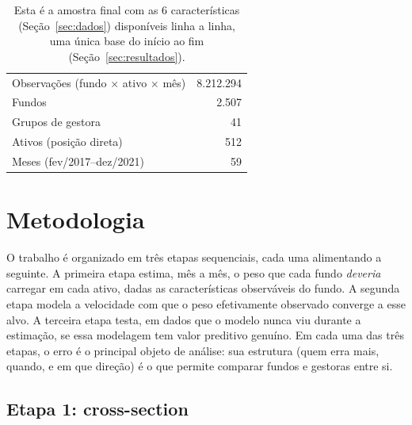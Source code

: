 \documentclass[11pt,a4paper]{article}
\begin{document}
\begin{table}[h]\centering
\caption{Dimensões da amostra final. Fonte: \texttt{painel\_multiativo\_final.csv}.}
\label{tab:amostra}
\begin{tabular}{@{}lr@{}}
\toprule
Observações (fundo $\times$ ativo $\times$ mês) & 8.212.294 \\
Fundos & 2.507 \\
Grupos de gestora & 41 \\
Ativos (posição direta) & 512 \\
Meses (fev/2017--dez/2021) & 59 \\
\bottomrule
\end{tabular}
\caption*{\footnotesize Esta é a amostra final com as 6 características (Seção~\ref{sec:dados})
disponíveis linha a linha, uma única base do início ao fim (Seção~\ref{sec:resultados}).}
\end{table}

\section{Metodologia}
\label{sec:metodologia}

O trabalho é organizado em três etapas sequenciais, cada uma alimentando a seguinte. A primeira
etapa estima, mês a mês, o peso que cada fundo \emph{deveria} carregar em cada ativo, dadas as
características observáveis do fundo. A segunda etapa modela a velocidade com que o peso
efetivamente observado converge a esse alvo. A terceira etapa testa, em dados que o modelo nunca
viu durante a estimação, se essa modelagem tem valor preditivo genuíno. Em cada uma das três
etapas, o erro é o principal objeto de análise: sua estrutura (quem erra mais, quando, e em que
direção) é o que permite comparar fundos e gestoras entre si.

\FloatBarrier
\subsection{Etapa 1: cross-section}
\end{document}

